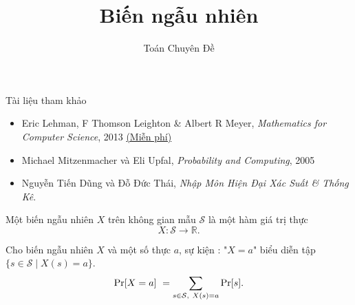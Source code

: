 
\title{Biến ngẫu nhiên} 
 \author{Toán Chuyên Đề}   
   
\maketitle  
 
\begin{frame}{Tài liệu tham khảo}
  \begin{itemize}
  \item Eric Lehman, F Thomson Leighton \& Albert R Meyer,
    \textit{Mathematics for Computer Science}, 2013
    \href{https://www.seas.harvard.edu/courses/cs20/MIT6_042Notes.pdf}{\color{blue}(Miễn
    phí)}
  \item Michael Mitzenmacher và Eli Upfal, \textit{Probability and Computing}, 2005
  \item  Nguyễn Tiến Dũng và Đỗ Đức Thái, \textit{Nhập Môn Hiện Đại Xác Suất \& Thống Kê}.
  \end{itemize}
\end{frame}

\begin{frame}
	\begin{dfntn}
		Một biến ngẫu nhiên $X$ trên không gian mẫu $\mathcal{S}$ là một hàm giá trị thực  
		\[
			X: \mathcal{S} \rightarrow \mathbb{R}.
		\]
	\end{dfntn}
Cho biến ngẫu nhiên $X$ và một số thực $a$, sự kiện : "$X = a$" biểu diễn tập $\{s \in \mathcal{S} \mid X(s) = a\}$.
\[
	\pr[X = a]\ = \sum_{s \in \mathcal{S},\ X(s) = a} \pr[s]. 
\]
\end{frame}

